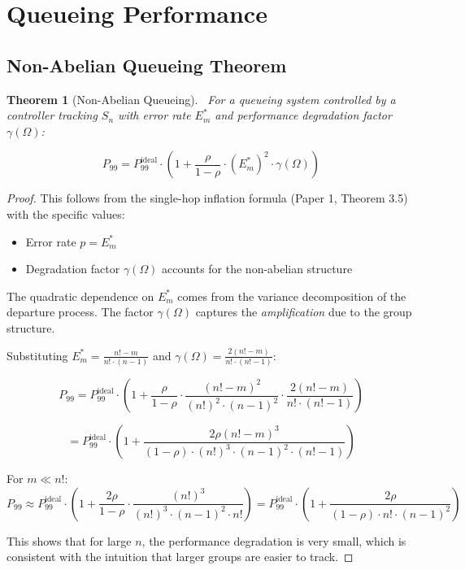 \documentclass[11pt]{article}
\newtheorem{theorem}{Theorem}[section]
\begin{document}
\section{Queueing Performance}

\subsection{Non-Abelian Queueing Theorem}

\begin{theorem}[Non-Abelian Queueing]~\label{thm:queueing}
For a queueing system controlled by a controller tracking $S_n$ with error rate $E_m^*$ and performance degradation factor $\gamma(\Omega)$:

$$P_{99} = P_{99}^{\text{ideal}} \cdot \left(1 + \frac{\rho}{1-\rho} \cdot (E_m^*)^2 \cdot \gamma(\Omega)\right)$$
\end{theorem}

\begin{proof}
This follows from the single-hop inflation formula (Paper 1, Theorem 3.5) with the specific values:
\begin{itemize}
    \item Error rate $p = E_m^*$
    \item Degradation factor $\gamma(\Omega)$ accounts for the non-abelian structure
\end{itemize}

The quadratic dependence on $E_m^*$ comes from the variance decomposition of the departure process. The factor $\gamma(\Omega)$ captures the \textit{amplification} due to the group structure.

Substituting $E_m^* = \frac{n! - m}{n! \cdot (n-1)}$ and $\gamma(\Omega) = \frac{2(n! - m)}{n! \cdot (n! - 1)}$:

$$P_{99} = P_{99}^{\text{ideal}} \cdot \left(1 + \frac{\rho}{1-\rho} \cdot \frac{(n! - m)^2}{(n!)^2 \cdot (n-1)^2} \cdot \frac{2(n! - m)}{n! \cdot (n! - 1)}\right)$$

$$= P_{99}^{\text{ideal}} \cdot \left(1 + \frac{2\rho(n! - m)^3}{(1-\rho) \cdot (n!)^3 \cdot (n-1)^2 \cdot (n! - 1)}\right)$$

For $m \ll n!$:
$$P_{99} \approx P_{99}^{\text{ideal}} \cdot \left(1 + \frac{2\rho}{1-\rho} \cdot \frac{(n!)^3}{(n!)^3 \cdot (n-1)^2 \cdot n!}\right) = P_{99}^{\text{ideal}} \cdot \left(1 + \frac{2\rho}{(1-\rho) \cdot n! \cdot (n-1)^2}\right)$$

This shows that for large $n$, the performance degradation is very small, which is consistent with the intuition that larger groups are easier to track.
\end{proof}
\end{document}
